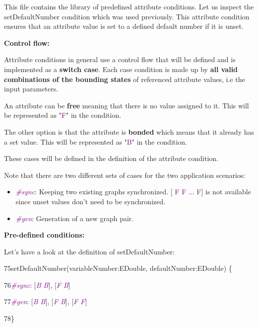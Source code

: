 This file contains the library of predefined attribute conditions. Let us inspect the setDefaultNumber condition which was used previously. This attribute condition ensures that an attribute value is set to a defined default number if it is unset. \newline

\textbf{Control flow:}

Attribute conditions in general
use a control flow that will be defined and is implemented as a \textbf{switch case}. Each case condition is made up by \textbf{all valid combinations of the bounding states} of referenced attribute values, i.e the input parameters.\newline

An attribute can be \textbf{free} meaning that there is no value assigned to it. This will be represented as "\textcolor{Purple}{F}" in the condition.

The other option is that the attribute is \textbf{bonded} which means that it already has a set value. This will be represented as "\textcolor{Purple}{B}" in the condition.

These cases will be defined in the definition of the attribute condition.\newline

Note that there are two different sets of cases for the two application scenarios:

\begin{itemize}
    \item\textcolor{Purple}{\textit{\#sync}}: Keeping two existing graphs synchronized. [\textcolor{Purple}{ F F } ... \textcolor{Purple}{ F}] is not available since unset values don't need to be synchronized.
    \item\textcolor{Purple}{\textit{\#gen}}: Generation of a new graph pair.
\end{itemize}

\clearpage

\textbf{Pre-defined conditions:}

Let's have a look at the definition of \textsf{setDefaultNumber}:\newline

{

75\hspace{0.5cm}setDefaultNumber(variableNumber:EDouble, defaultNumber:EDouble) \{

76\hspace{1cm}\textcolor{Purple}{\textit{\#sync}}: [\textcolor{Purple}{\textit{B B}}], [\textcolor{Purple}{\textit{F B}}]

77\hspace{1cm}\textcolor{Purple}{\textit{\#gen}}: [\textcolor{Purple}{\textit{B B}}], [\textcolor{Purple}{\textit{F B}}], [\textcolor{Purple}{\textit{F F}}]

78\hspace{0.5cm}\}\newline

}


